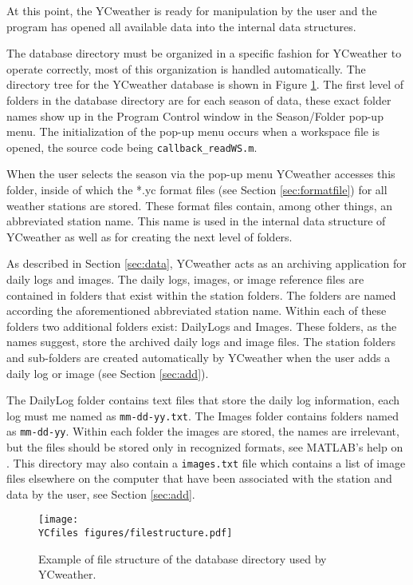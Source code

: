 At this point, the YCweather is ready for manipulation by the user and the program has opened all available data into the internal data structures.

\label{sec:database}
The database directory must be organized in a specific fashion for YCweather to operate correctly, most of this organization is handled automatically.  The directory tree for the YCweather database is shown in Figure \ref{fig:filestructure}.  The first level of folders in the database directory are for each season of data, these exact folder names show up in the Program Control window in the Season/Folder pop-up menu.  The initialization of the pop-up menu occurs when a workspace file is opened, the source code being \texttt{callback\_readWS.m}.

When the user selects the season via the pop-up menu YCweather accesses this folder, inside of which the *.yc format files (see Section \ref{sec:formatfile}) for all weather stations are stored.  These format files contain, among other things, an abbreviated station name.  This name is used in the internal data structure of YCweather as well as for creating the next level of folders.

As described in Section \ref{sec:data}, YCweather acts as an archiving application for daily logs and images.  The daily logs, images, or image reference files are contained in folders that exist within the station folders.  The folders are named according the aforementioned abbreviated station name.  Within each of these folders two additional folders exist: DailyLogs and Images.  These folders, as the names suggest, store the archived daily logs and image files.  The station folders and sub-folders are created automatically by YCweather when the user adds a daily log or image (see Section \ref{sec:add}).

The DailyLog folder contains text files that store the daily log information, each log must me named as \texttt{mm-dd-yy.txt}.  The Images folder contains folders named as \texttt{mm-dd-yy}.  Within each folder the images are stored, the names are irrelevant, but the files should be stored only in recognized formats, see MATLAB's help on .  This directory may also contain a \texttt{images.txt} file which contains a list of image files elsewhere on the computer that have been associated with the station and data by the user, see Section \ref{sec:add}.

\begin{figure}[h]\centering
	\texttt{[image: \\YCfiles figures/filestructure.pdf]}
	\caption{Example of file structure of the database directory used by YCweather.}
	\label{fig:filestructure}
\end{figure}

